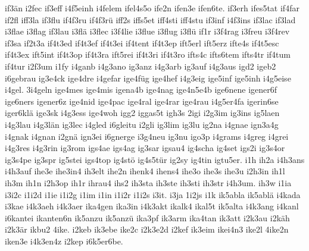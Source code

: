 {    if3än
    i2fec
    if3eff
    i4f5einh
    i4felem
    ifel4s5o
    ife2n
    ifen3e
    ifen6te.
    if3erh
    ifes5tat
    if4far
    if2fl
    iff3la
    if3flu
    if4f3ru
    if4f3rü
    iff2s
    iffs5et
    iff4sti
    iff4stu
    if3inf
    i4f3ins
    if3lac
    if3lad
    i3flae
    i3flag
    if3lau
    i3flä
    i3flec
    i3f4lie
    i3flue
    i3flug
    i3flü
    if1r
    i3f4rag
    i3freu
    i3f4rev
    if3sa
    if2t3a
    if4t3ed
    if4t3ef
    if4t3ei
    if4tent
    if4t3ep
    ift5erl
    ift5erz
    ifte4s
    if4t5esc
    if4t3ex
    ift5int
    if4t3op
    if4t3ra
    ift5rei
    if4t3ri
    if4t3ro
    ifts4c
    ifts6tem
    ifts4tr
    if4tum
    if4tur
    i2f3um
    i1fy
    i4ganb
    i4g3ano
    ig3anz
    i4g3arb
    ig3auf
    i4g3aus
    igd2
    igeb2
    i6gebrau
    ig3e4ck
    ige4dre
    i4gefar
    ige4füg
    ige4hef
    i4g3eig
    ige5inf
    ige5inh
    i4g5eise
    i4gel.
    3i4geln
    ige4mes
    ige4mis
    igena4b
    ige4nag
    ige4n5e4b
    ige6nene
    igener6f
    ige6ners
    igener6z
    ige4nid
    ige4pac
    ige4ral
    ige4rar
    ige4rau
    i4g5er4fa
    igerin6se
    iger6klä
    ige3sk
    i4g3ess
    ige4woh
    igg2
    iggas5t
    igh3s
    2igi
    i2g3im
    ig3ins
    ig5laen
    i4g3lau
    i4g3län
    ig3lec
    i4gled
    i6gleitu
    i2gli
    ig3lim
    ig3lu
    ig2na
    i4gnae
    ign3a4g
    i4gnak
    i4gnan
    i2gnä
    ign3ei
    i6gnerge
    i3g4neu
    ig3nu
    igo3p
    i4grams
    i4greg
    i4grei
    i4g3res
    i4g3rin
    ig3rom
    igs4ae
    igs4ag
    ig3sar
    igsau4
    ig4scha
    ig4set
    igs2i
    ig3s4or
    ig3s4pe
    ig3spr
    ig5stei
    igs4top
    ig4stö
    ig4s5tür
    ig2sy
    ig4tin
    igtu5er.
    i1h
    ih2a
    i4h3ans
    i4h3auf
    ihe3e
    ihe3in4
    ih3elt
    ihe2n
    ihenk4
    ihens4
    ihe3o
    ihe3s
    ihe3u
    i2h3in
    ih1l
    ih3m
    ih1n
    i2h3op
    ih1r
    ihrau4
    ihs2
    ih3sta
    ih3ste
    ih3sti
    ih3str
    i4h3um.
    ih3w
    i1ia
    i3i2c
    i1i2d
    i1ie
    i1i2g
    i1im
    i1in
    i1i2r
    i1i2s
    i3it.
    i3ja
    1i2js
    i1k
    ik5abla
    ik5ablä
    i4kada
    i3kae
    i4k3aeh
    i4k3aer
    ika4gen
    ika3in
    i4k3akt
    ikalk4
    ikal5t
    ik5alta
    i4k3ang
    i4kanl
    i6kantei
    ikanten6n
    ik5anzu
    ik5anzü
    ika3pf
    ik3arm
    ika4tan
    ik3att
    i2k3au
    i2käh
    i2k3är
    ikbu2
    4ike.
    i2keb
    ik3ebe
    ike2c
    i2k3e2d
    i2kef
    ik3eim
    ikei4n3
    ike2l
    4ike2n
    iken3e
    i4k3en4z
    i2kep
    i6k5er6be.
}
